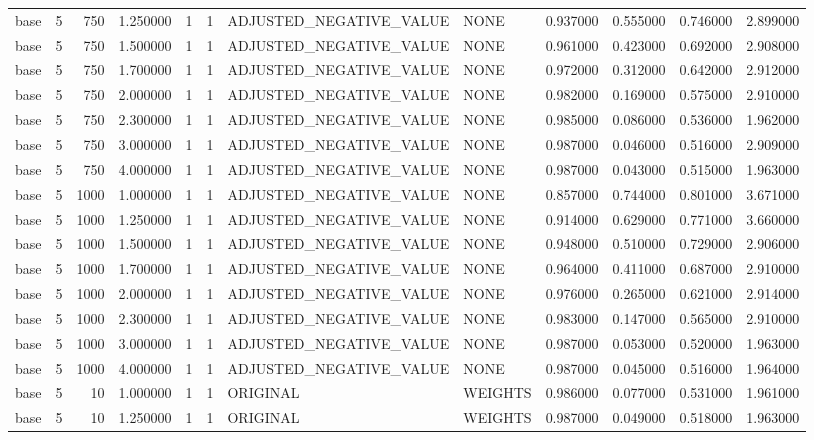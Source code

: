 \begin{tabular}{lrrrllllrrrr}
base & 5 & 750 & 1.250000 & 1 & 1 & ADJUSTED_NEGATIVE_VALUE & NONE & 0.937000 & 0.555000 & 0.746000 & 2.899000 \\
base & 5 & 750 & 1.500000 & 1 & 1 & ADJUSTED_NEGATIVE_VALUE & NONE & 0.961000 & 0.423000 & 0.692000 & 2.908000 \\
base & 5 & 750 & 1.700000 & 1 & 1 & ADJUSTED_NEGATIVE_VALUE & NONE & 0.972000 & 0.312000 & 0.642000 & 2.912000 \\
base & 5 & 750 & 2.000000 & 1 & 1 & ADJUSTED_NEGATIVE_VALUE & NONE & 0.982000 & 0.169000 & 0.575000 & 2.910000 \\
base & 5 & 750 & 2.300000 & 1 & 1 & ADJUSTED_NEGATIVE_VALUE & NONE & 0.985000 & 0.086000 & 0.536000 & 1.962000 \\
base & 5 & 750 & 3.000000 & 1 & 1 & ADJUSTED_NEGATIVE_VALUE & NONE & 0.987000 & 0.046000 & 0.516000 & 2.909000 \\
base & 5 & 750 & 4.000000 & 1 & 1 & ADJUSTED_NEGATIVE_VALUE & NONE & 0.987000 & 0.043000 & 0.515000 & 1.963000 \\
base & 5 & 1000 & 1.000000 & 1 & 1 & ADJUSTED_NEGATIVE_VALUE & NONE & 0.857000 & 0.744000 & 0.801000 & 3.671000 \\
base & 5 & 1000 & 1.250000 & 1 & 1 & ADJUSTED_NEGATIVE_VALUE & NONE & 0.914000 & 0.629000 & 0.771000 & 3.660000 \\
base & 5 & 1000 & 1.500000 & 1 & 1 & ADJUSTED_NEGATIVE_VALUE & NONE & 0.948000 & 0.510000 & 0.729000 & 2.906000 \\
base & 5 & 1000 & 1.700000 & 1 & 1 & ADJUSTED_NEGATIVE_VALUE & NONE & 0.964000 & 0.411000 & 0.687000 & 2.910000 \\
base & 5 & 1000 & 2.000000 & 1 & 1 & ADJUSTED_NEGATIVE_VALUE & NONE & 0.976000 & 0.265000 & 0.621000 & 2.914000 \\
base & 5 & 1000 & 2.300000 & 1 & 1 & ADJUSTED_NEGATIVE_VALUE & NONE & 0.983000 & 0.147000 & 0.565000 & 2.910000 \\
base & 5 & 1000 & 3.000000 & 1 & 1 & ADJUSTED_NEGATIVE_VALUE & NONE & 0.987000 & 0.053000 & 0.520000 & 1.963000 \\
base & 5 & 1000 & 4.000000 & 1 & 1 & ADJUSTED_NEGATIVE_VALUE & NONE & 0.987000 & 0.045000 & 0.516000 & 1.964000 \\
base & 5 & 10 & 1.000000 & 1 & 1 & ORIGINAL & WEIGHTS & 0.986000 & 0.077000 & 0.531000 & 1.961000 \\
base & 5 & 10 & 1.250000 & 1 & 1 & ORIGINAL & WEIGHTS & 0.987000 & 0.049000 & 0.518000 & 1.963000 \\

\end{tabular}
